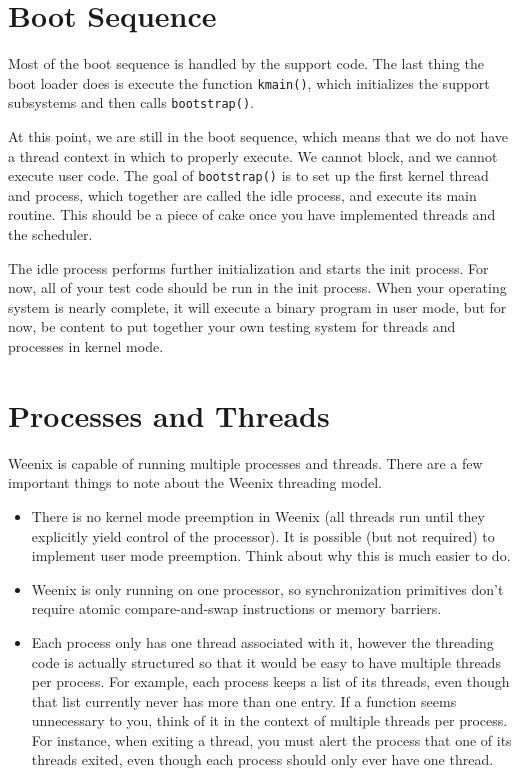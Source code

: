 \section{Boot Sequence}

Most of the boot sequence is handled by the support code. The last thing the boot loader does is execute the function \texttt{kmain()}, which initializes the support subsystems and then calls \texttt{bootstrap()}.

At this point, we are still in the boot sequence, which means that we do not have a thread context in which to properly execute. We cannot block, and we cannot execute user code. The goal of \texttt{bootstrap()} is to set up the first kernel thread and process, which together are called the idle process, and execute its main routine. This should be a piece of cake once you have implemented threads and the scheduler.

The idle process performs further initialization and starts the init process. For now, all of your test code should be run in the init process. When your operating system is nearly complete, it will execute a binary program in user mode, but for now, be content to put together your own testing system for threads and processes in kernel mode.

\section{Processes and Threads}

Weenix is capable of running multiple processes and threads. There are a few important things to note about the Weenix threading model.
\begin{itemize}
    \item There is no kernel mode preemption in Weenix (all threads run until they explicitly yield control of the processor). It is possible (but not required) to implement user mode preemption. Think about why this is much easier to do.
    \item Weenix is only running on one processor, so synchronization primitives don't require atomic compare-and-swap instructions or memory barriers.
    \item Each process only has one thread associated with it, however the threading code is actually structured so that it would be easy to have multiple threads per process. For example, each process keeps a list of its threads, even though that list currently never has more than one entry. If a function seems unnecessary to you, think of it in the context of multiple threads per process. For instance, when exiting a thread, you must alert the process that one of its threads exited, even though each process should only ever have one thread.
\end{itemize}

